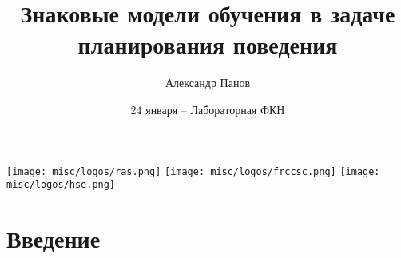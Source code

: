 \documentclass[default]{beamer}
\begin{document}
	
	\title[Обучение в знаковой КМ]{Знаковые модели обучения в задаче планирования поведения}
	\author[Панов]{Александр Панов}
	\date{24 января -- Лабораторная ФКН} 
	
	\begin{frame}
		\titlepage
		\centering
		\texttt{[image: misc/logos/ras.png]} \hspace{10pt}
		\texttt{[image: misc/logos/frccsc.png]} \hspace{10pt}
		\texttt{[image: misc/logos/hse.png]}
	\end{frame}
	
	\begin{frame}
		\tableofcontents
	\end{frame}

	\section{Введение}
\end{document}
